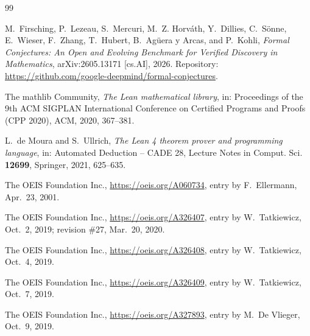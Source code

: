 \documentclass[11pt]{amsart}
\theoremstyle{plain}
\theoremstyle{definition}
\begin{document}
{\small
\begin{thebibliography}{99}

M.~Firsching, P.~Lezeau, S.~Mercuri, M.~Z. Horv\'ath, Y.~Dillies, C.~S\"onne, E.~Wieser, F.~Zhang, T.~Hubert, B.~Ag\"uera y Arcas, and P.~Kohli, \emph{Formal Conjectures: An Open and Evolving Benchmark for Verified Discovery in Mathematics}, arXiv:2605.13171 [cs.AI], 2026. Repository: \url{https://github.com/google-deepmind/formal-conjectures}.

The mathlib Community, \emph{The Lean mathematical library}, in: Proceedings of the 9th ACM SIGPLAN International Conference on Certified Programs and Proofs (CPP 2020), ACM, 2020, 367--381.

L.~de Moura and S.~Ullrich, \emph{The Lean 4 theorem prover and programming language}, in: Automated Deduction -- CADE 28, Lecture Notes in Comput. Sci. \textbf{12699}, Springer, 2021, 625--635.

The OEIS Foundation Inc., \url{https://oeis.org/A060734}, entry by F.~Ellermann, Apr.~23, 2001.

The OEIS Foundation Inc., \url{https://oeis.org/A326407}, entry by W.~Tatkiewicz, Oct.~2, 2019; revision \#27, Mar.~20, 2020.

The OEIS Foundation Inc., \url{https://oeis.org/A326408}, entry by W.~Tatkiewicz, Oct.~4, 2019.

The OEIS Foundation Inc., \url{https://oeis.org/A326409}, entry by W.~Tatkiewicz, Oct.~7, 2019.

The OEIS Foundation Inc., \url{https://oeis.org/A327893}, entry by M.~De Vlieger, Oct.~9, 2019.

\end{thebibliography}
}
\end{document}
